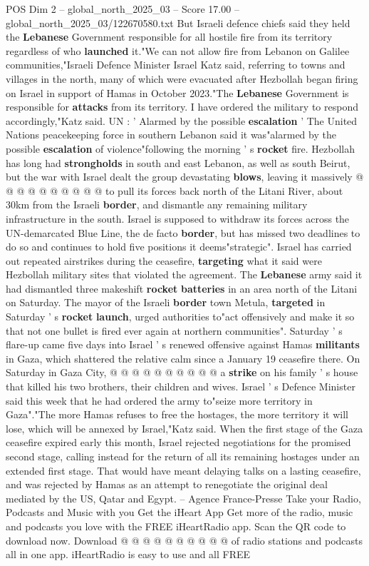 \begin{textsample}{POS Dim 2 – global\_north\_2025\_03 – Score 17.00 – global\_north\_2025\_03/122670580.txt}
But Israeli defence chiefs said they held the \textbf{Lebanese} Government responsible for all hostile fire from its territory regardless of who \textbf{launched} it."We can not allow fire from Lebanon on Galilee communities,"Israeli Defence Minister Israel Katz said, referring to towns and villages in the north, many of which were evacuated after Hezbollah began firing on Israel in support of Hamas in October 2023."The \textbf{Lebanese} Government is responsible for \textbf{attacks} from its territory.
I have ordered the military to respond accordingly,"Katz said.
UN : ' Alarmed by the possible \textbf{escalation} ' The United Nations peacekeeping force in southern Lebanon said it was"alarmed by the possible \textbf{escalation} of violence"following the morning ' s \textbf{rocket} fire.
Hezbollah has long had \textbf{strongholds} in south and east Lebanon, as well as south Beirut, but the war with Israel dealt the group devastating \textbf{blows}, leaving it massively @ @ @ @ @ @ @ @ @ @ to pull its forces back north of the Litani River, about 30km from the Israeli \textbf{border}, and dismantle any remaining military infrastructure in the south.
Israel is supposed to withdraw its forces across the UN-demarcated Blue Line, the de facto \textbf{border}, but has missed two deadlines to do so and continues to hold five positions it deems"strategic".
Israel has carried out repeated airstrikes during the ceasefire, \textbf{targeting} what it said were Hezbollah military sites that violated the agreement.
The \textbf{Lebanese} army said it had dismantled three makeshift \textbf{rocket} \textbf{batteries} in an area north of the Litani on Saturday.
The mayor of the Israeli \textbf{border} town Metula, \textbf{targeted} in Saturday ' s \textbf{rocket} \textbf{launch}, urged authorities to"act offensively and make it so that not one bullet is fired ever again at northern communities".
Saturday ' s flare-up came five days into Israel ' s renewed offensive against Hamas \textbf{militants} in Gaza, which shattered the relative calm since a January 19 ceasefire there.
On Saturday in Gaza City, @ @ @ @ @ @ @ @ @ @ a \textbf{strike} on his family ' s house that killed his two brothers, their children and wives.
Israel ' s Defence Minister said this week that he had ordered the army to"seize more territory in Gaza"."The more Hamas refuses to free the hostages, the more territory it will lose, which will be annexed by Israel,"Katz said.
When the first stage of the Gaza ceasefire expired early this month, Israel rejected negotiations for the promised second stage, calling instead for the return of all its remaining hostages under an extended first stage.
That would have meant delaying talks on a lasting ceasefire, and was rejected by Hamas as an attempt to renegotiate the original deal mediated by the US, Qatar and Egypt. -- Agence France-Presse Take your Radio, Podcasts and Music with you Get the iHeart App Get more of the radio, music and podcasts you love with the FREE iHeartRadio app.
Scan the QR code to download now.
Download @ @ @ @ @ @ @ @ @ @ of radio stations and podcasts all in one app. iHeartRadio is easy to use and all FREE


\end{textsample}
